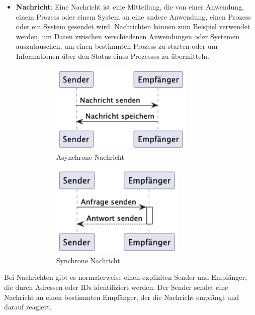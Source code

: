 \documentclass[../vs-script-first-v01.tex]{subfiles}
\begin{document}
\begin{itemize}
\item \textbf{Nachricht}:
Eine Nachricht ist eine Mitteilung, die von einer Anwendung, einem Prozess oder einem System an eine andere Anwendung, einen Prozess oder ein System gesendet wird. Nachrichten können zum Beispiel verwendet werden, um Daten zwischen verschiedenen Anwendungen oder Systemen auszutauschen, um einen bestimmten Prozess zu starten oder um Informationen über den Status eines Prozesses zu übermitteln. 
\begin{figure}[!ht]
    \centering
    \begin{subfigure}[b]{0.45\textwidth}
      \includegraphics[width=0.8\textwidth]{fig/uml/async-message.png}
      \caption{Asynchrone Nachricht}
      \label{fig:async-msg}
    \end{subfigure}
    \hfill
    \begin{subfigure}[b]{0.45\textwidth}
        \includegraphics[width=0.75\textwidth]{fig/uml/sync-message.png}
        \caption{Synchrone Nachricht}
        \label{fig:sync-msg}
    \end{subfigure}
    \caption{}
    \label{fig:gesamt}
\end{figure}
\end{itemize}  
Bei Nachrichten gibt es normalerweise einen expliziten Sender und Empfänger, die durch Adressen oder IDs identifiziert werden. Der Sender sendet eine Nachricht an einen bestimmten Empfänger, der die Nachricht empfängt und darauf reagiert.
\end{document}
